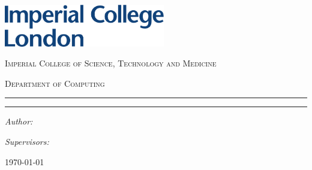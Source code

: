 \begin{titlepage}
	
	\noindent\includegraphics[width=7cm]{./figures/imperial}
	
	\Large\centering
	
	\vspace*{3\baselineskip}	
	\textsc{\LARGE \reporttype}
	
	\vspace*{\baselineskip}	
	\textsc{Imperial College of Science, Technology and Medicine}

	\vspace*{\baselineskip}	
	\textsc{Department of Computing}


	\setlength{\parindent}{0pt}
	
	\setlength{\parskip}{0pt}

	\rule{\linewidth}{0.4pt}\vspace*{\baselineskip}

	{\huge\bfseries\reporttitle}
	\rule{\linewidth}{0.4pt}

	\begin{multicols}{2}
		\begin{flushleft}
			\emph{Author:}
			
			\reportauthor
		\end{flushleft}
		\begin{flushright}
			\emph{Supervisors:}
			
			\supervisor
		\end{flushright}			
	\end{multicols}
	
	
	\monthyeardate\today
	
	
\end{titlepage}
